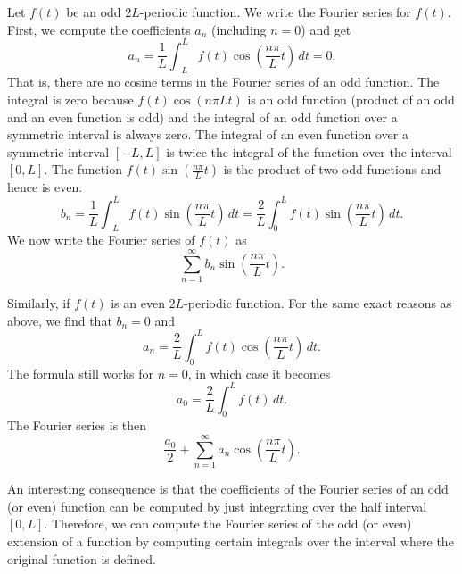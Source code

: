 \documentclass{ximera}
\begin{document}
Let $f(t)$ be an odd $2L$-periodic function.  We write the Fourier series for $f(t)$.  First, we compute the coefficients $a_n$ (including $n=0$) and get
\begin{equation*}
    a_n = \frac{1}{L} \int_{-L}^L f(t) \cos \left( \frac{n \pi}{L} t \right) \, dt = 0 .
\end{equation*}
That is, there are no cosine terms in the Fourier series of an odd function. The integral is zero because $f(t) \cos \left( {n \pi}{L} t \right)$ is an odd function (product of an odd and an even function is odd) and the integral of an odd function over a symmetric interval is always zero. The integral of an even function over a symmetric interval $[-L,L]$ is twice the integral of the function over the interval $[0,L]$. The function $f(t) \sin \left( \frac{n \pi}{L} t \right)$ is the product of two odd functions and hence is even.
\begin{equation*}
    b_n = \frac{1}{L} \int_{-L}^L f(t) \sin \left( \frac{n \pi}{L} t \right) \, dt = \frac{2}{L} \int_{0}^L f(t) \sin \left( \frac{n \pi}{L} t \right) \, dt .
\end{equation*}
We now write the Fourier series of $f(t)$ as
\begin{equation*}
    \sum_{n=1}^\infty b_n \sin \left( \frac{n \pi}{L} t \right) .
\end{equation*}

Similarly, if $f(t)$ is an even $2L$-periodic function.  For the same exact reasons as above, we find that $b_n = 0$ and
\begin{equation*}
    a_n = \frac{2}{L} \int_{0}^L f(t) \cos \left( \frac{n \pi}{L} t \right) \, dt .
\end{equation*}
The formula still works for $n=0$, in which case it becomes
\begin{equation*}
    a_0 = \frac{2}{L} \int_{0}^L f(t) \, dt .
\end{equation*}
The Fourier series is then
\begin{equation*}
    \frac{a_0}{2} + \sum_{n=1}^\infty a_n \cos \left( \frac{n \pi}{L} t \right) .
\end{equation*}

An interesting consequence is that the coefficients of the Fourier series of an odd (or even) function can be computed by just integrating over the half interval $[0,L]$.  Therefore, we can compute the Fourier series of the odd (or even) extension of a function by computing certain integrals over the interval where the original function is defined.
\end{document}
